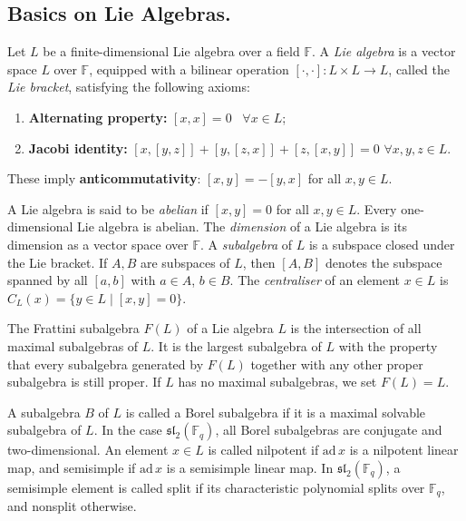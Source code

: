 \documentclass[11pt]{amsart}
\theoremstyle{plain}
\def\F{\mathbb{F}}
\def\ad{\mathrm{ad}}
\begin{document}
\subsection*{Basics on Lie Algebras.}
Let $L$ be a finite-dimensional Lie algebra over a field $\mathbb{F}$. A \emph{Lie algebra} is a vector space $L$ over $\mathbb{F}$, equipped with a bilinear operation $[\cdot,\cdot]: L \times L \to L$, called the \emph{Lie bracket}, satisfying the following axioms:
\begin{enumerate}
    \item \textbf{Alternating property:} $[x,x] = 0$ \ $\forall  x \in L$;
    \item \textbf{Jacobi identity:} $[x,[y,z]] + [y,[z,x]] + [z,[x,y]] = 0$ $\forall x, y, z \in L$.
\end{enumerate}
These imply \textbf{anticommutativity}: $[x,y] = -[y,x]$ for all $x,y \in L$.

A Lie algebra is said to be \emph{abelian} if $[x,y] = 0$ for all $x,y \in L$. Every one-dimensional Lie algebra is abelian. The \emph{dimension} of a Lie algebra is its dimension as a vector space over $\mathbb{F}$. A \emph{subalgebra} of $L$ is a subspace closed under the Lie bracket. If $A, B$ are subspaces of $L$, then $[A,B]$ denotes the subspace spanned by all $[a,b]$ with $a \in A$, $b \in B$. The \emph{centraliser} of an element $x\in L$ is $C_L(x)=\{y\in L \mid [x,y]=0\}$.

The Frattini subalgebra $F(L)$ of a Lie algebra $L$ is the intersection of all maximal subalgebras of $L$. It is the largest subalgebra of $L$ with the property that every subalgebra generated by $F(L)$ together with any other proper subalgebra is still proper. If $L$ has no maximal subalgebras, we set $F(L) = L$. 

A subalgebra $B$ of $L$ is called a Borel subalgebra if it is a maximal solvable subalgebra of $L$. In the case $\mathfrak{sl}_2(\mathbb{F}_q)$, all Borel subalgebras are conjugate and two-dimensional. An element $x\in L$ is called nilpotent if $\ad\, x$ is a nilpotent linear map, and semisimple if $\ad\, x$ is a semisimple linear map. In $\mathfrak{sl}_2(\mathbb{F}_q)$, a semisimple element is called split if its characteristic polynomial splits over $\F_q$, and nonsplit otherwise.
\end{document}
